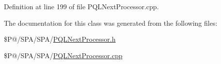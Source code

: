 Definition at line 199 of file P\-Q\-L\-Next\-Processor.\-cpp.



The documentation for this class was generated from the following files\-:\begin{DoxyCompactItemize}
\item 
\$\-P@/\-S\-P\-A/\-S\-P\-A/\hyperlink{_p_q_l_next_processor_8h}{P\-Q\-L\-Next\-Processor.\-h}\item 
\$\-P@/\-S\-P\-A/\-S\-P\-A/\hyperlink{_p_q_l_next_processor_8cpp}{P\-Q\-L\-Next\-Processor.\-cpp}\end{DoxyCompactItemize}
